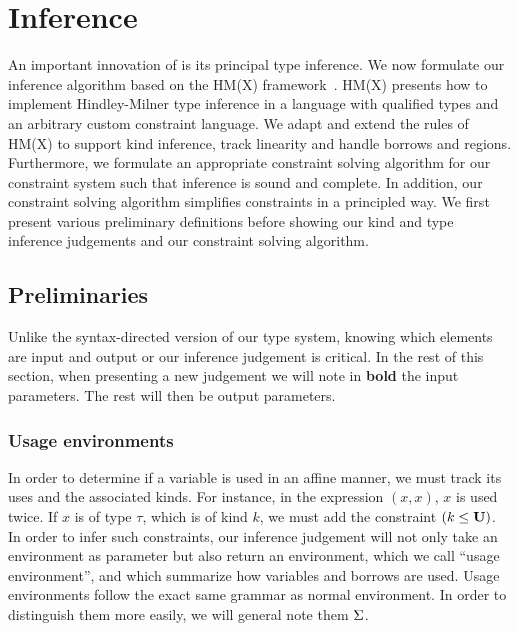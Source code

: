 \section{Inference}

An important innovation of \affe is its principal type inference.
We now formulate our inference algorithm
based on the HM(X) framework~\citep{DBLP:journals/tapos/OderskySW99}.
HM(X) presents how to implement Hindley-Milner type inference in a language
with qualified types and an arbitrary custom constraint language.
We adapt and extend the rules of HM(X) to support kind inference,
track linearity and handle borrows and regions. Furthermore, we
formulate an appropriate constraint solving algorithm for our constraint
system such that inference is sound and complete.
In addition, our constraint solving algorithm simplifies constraints in a
principled way.
We first present various preliminary definitions
before showing our kind and type inference judgements
and our constraint solving algorithm.

\subsection{Preliminaries}

Unlike the syntax-directed version of our type system, knowing which elements
are input and output or our inference judgement is critical. In the rest
of this section, when presenting a new judgement
we will note in \textbf{bold} the input parameters. The rest will then be
output parameters.

\subsubsection{Usage environments}


In order to determine if a variable is used in an affine manner, we must track
its uses and the associated kinds. For instance, in the expression
$(x,x)$, $x$ is used twice. If $x$ is of type $\tau$, which is of kind $k$,
we must add the constraint $(k \leq \mathbf{U})$.
%
In order to infer such constraints, our inference judgement will not only
take an environment as parameter but also return an environment, which
we call ``usage environment'', and which summarize how variables and borrows
are used. Usage environments follow the exact same grammar
as normal environment. In order to distinguish them more easily,
we will general note them $\Sigma$.

